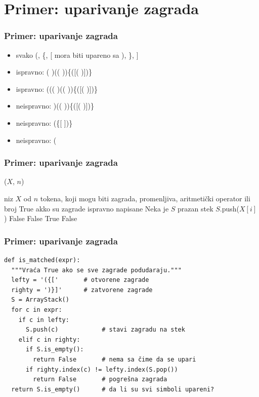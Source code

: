 \documentclass[compress]{beamer}
\begin{document}
\section[P: Zagrade]{Primer: uparivanje zagrada}
\begin{frame}[fragile]
  \frametitle{Primer: uparivanje zagrada}
  \begin{itemize}
    \item svako (, \{, [ mora biti upareno sa ), \}, ]
    \item ispravno: ( )(( ))\{([( )])\}
    \item ispravno: ((( )(( ))\{([( )])\}
    \item neispravno: )(( ))\{([( )])\}
    \item neispravno: (\{[ ])\}
    \item neispravno: (
  \end{itemize}
\end{frame}

\begin{frame}[fragile,shrink=10]
  \frametitle{Primer: uparivanje zagrada}
($X$, $n$)
\begin{algorithmic}
\REQUIRE niz $X$ od $n$ tokena, koji mogu biti zagrada, promenljiva, aritmetički operator ili broj
\ENSURE True akko su zagrade ispravno napisane
\STATE Neka je $S$ prazan stek
    \STATE $S$.push($X[i]$)
      \RETURN False 
    \ENDIF
      \RETURN False 
    \ENDIF
  \ENDIF
\ENDFOR
{}
  \RETURN True 
\ELSE
  \RETURN False 
\ENDIF
\end{algorithmic}
\end{frame}

\begin{frame}[fragile,shrink=10]
  \frametitle{Primer: uparivanje zagrada}
\begin{verbatim}
def is_matched(expr):
  """Vraća True ako se sve zagrade podudaraju."""
  lefty = '({['       # otvorene zagrade
  righty = ')}]'      # zatvorene zagrade
  S = ArrayStack()
  for c in expr:
    if c in lefty:
      S.push(c)            # stavi zagradu na stek
    elif c in righty:
      if S.is_empty():
        return False       # nema sa čime da se upari
      if righty.index(c) != lefty.index(S.pop())
        return False       # pogrešna zagrada
  return S.is_empty()      # da li su svi simboli upareni?
\end{verbatim}
\end{frame}
\end{document}
